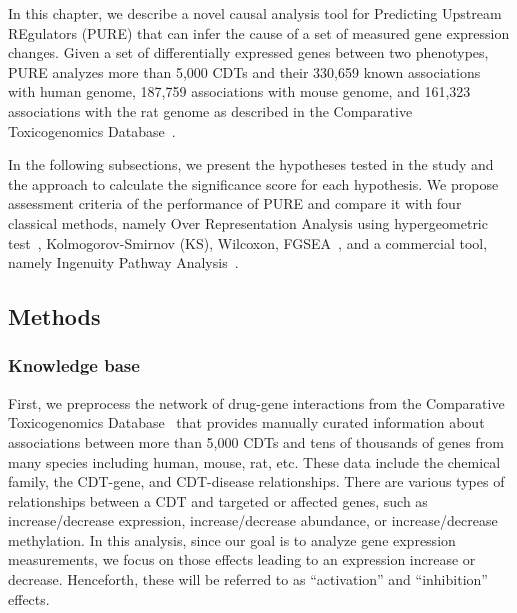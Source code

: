 In this chapter, we describe a novel causal analysis tool for Predicting Upstream REgulators (PURE) that can infer the cause of a set of measured gene expression changes. 
Given a set of differentially expressed genes between two phenotypes, PURE 
 analyzes more  than 5,000 CDTs and their 330,659 known associations with human genome, 187,759 associations with mouse genome, and 161,323 associations with the rat genome as described in the Comparative Toxicogenomics Database~\cite{mattingly2006comparative}. 
 
 
In the following subsections, we present the hypotheses tested in the study and the approach to calculate the significance score for each hypothesis.
We propose  assessment criteria of the performance of PURE and compare it with four classical methods, namely Over Representation Analysis using hypergeometric test~\cite{DraghiciOE2:2003}, Kolmogorov-Smirnov (KS)\cite{massey1951kolmogorov}, Wilcoxon\cite{wilcoxon1945individual}, FGSEA~\cite{korotkevich2021fast}, and a commercial tool, namely Ingenuity Pathway Analysis~\cite{kramer2013causal}. 

\subsection{Methods}

\subsubsection{Knowledge base}
First, we preprocess the network of drug-gene interactions from the Comparative Toxicogenomics Database~\cite{mattingly2006comparative} that provides manually curated information about associations between more than 5,000 CDTs and tens of thousands of genes from many species including human, mouse, rat, etc. These data include the chemical family, the CDT-gene, and CDT-disease relationships.
There are various types of relationships between a CDT and targeted or affected genes, such as increase/decrease expression, increase/decrease abundance, or increase/decrease methylation.
In this analysis, since our goal is to analyze gene expression measurements, we focus on  those effects leading to an expression increase or decrease. Henceforth, these will be referred to as ``activation'' and ``inhibition'' effects.

